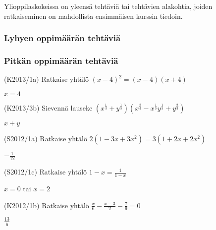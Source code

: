 Ylioppilaskokeissa on yleensä tehtäviä tai tehtävien alakohtia, joiden ratkaiseminen on mahdollista ensimmäisen kurssin tiedoin.



\subsubsection*{Lyhyen oppimäärän tehtäviä}



\subsubsection*{Pitkän oppimäärän tehtäviä}

\begin{tehtava} (K2013/1a)  Ratkaise yhtälö
						$(x-4)^2=(x-4)(x+4)$
				\begin{vastaus}
				$x=4$
				\end{vastaus}
\end{tehtava}

\begin{tehtava}
	(K2013/3b)  Sievennä lauseke 
						$(x^\frac{1}{3} + y^\frac{1}{3})(x^\frac{2}{3} - x^\frac{1}{3}y^\frac{1}{3} + y^\frac{2}{3})$
						\begin{vastaus}
				$x+y$
				\end{vastaus}
						\end{tehtava}
						
\begin{tehtava} (S2012/1a)  Ratkaise yhtälö
						$2(1-3x+3x^2)=3(1+2x+2x^2)$
						\begin{vastaus}
				$-\frac{1}{12}$
				\end{vastaus}
\end{tehtava}

\begin{tehtava}(S2012/1c)  Ratkaise yhtälö
						$1-x=\frac{1}{1-x}$
						\begin{vastaus}
				$x=0$ tai $x=2$
				\end{vastaus}
\end{tehtava}

\begin{tehtava}(K2012/1b)  Ratkaise yhtälö
                        $\frac{x}{6} - \frac{x-3}{2} - \frac{7}{9} = 0 $ 
                        \begin{vastaus}
				$\frac{13}{6}$
				\end{vastaus}
\end{tehtava}

